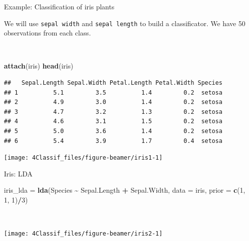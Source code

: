 \documentclass[
  10pt,
  ignorenonframetext,
]{beamer}
\newenvironment{Shaded}{\begin{snugshade}}{\end{snugshade}}
\newcommand{\AttributeTok}[1]{\textcolor[rgb]{0.13,0.29,0.53}{#1}}
\newcommand{\DecValTok}[1]{\textcolor[rgb]{0.00,0.00,0.81}{#1}}
\newcommand{\FunctionTok}[1]{\textcolor[rgb]{0.13,0.29,0.53}{\textbf{#1}}}
\newcommand{\NormalTok}[1]{#1}
\newcommand{\OtherTok}[1]{\textcolor[rgb]{0.56,0.35,0.01}{#1}}
\newcommand{\SpecialCharTok}[1]{\textcolor[rgb]{0.81,0.36,0.00}{\textbf{#1}}}
\begin{document}
\begin{frame}[fragile]
\begin{block}{Example: Classification of iris plants}
\protect\hypertarget{example-classification-of-iris-plants}{}
\vspace{2mm}

We will use \texttt{sepal\ width} and \texttt{sepal\ length} to build a
classificator. We have 50 observations from each class.

\(~\)

\scriptsize

\begin{Shaded}
\begin{Highlighting}[]
\FunctionTok{attach}\NormalTok{(iris)}
\FunctionTok{head}\NormalTok{(iris)}
\end{Highlighting}
\end{Shaded}

\begin{verbatim}
##   Sepal.Length Sepal.Width Petal.Length Petal.Width Species
## 1          5.1         3.5          1.4         0.2  setosa
## 2          4.9         3.0          1.4         0.2  setosa
## 3          4.7         3.2          1.3         0.2  setosa
## 4          4.6         3.1          1.5         0.2  setosa
## 5          5.0         3.6          1.4         0.2  setosa
## 6          5.4         3.9          1.7         0.4  setosa
\end{verbatim}
\end{block}
\end{frame}

\begin{frame}
\begin{center}\texttt{[image: 4Classif\_files/figure-beamer/iris1-1]} \end{center}
\end{frame}

\begin{frame}[fragile]
\begin{block}{Iris: LDA}
\protect\hypertarget{iris-lda}{}
\scriptsize

\begin{Shaded}
\begin{Highlighting}[]
\NormalTok{iris\_lda }\OtherTok{=} \FunctionTok{lda}\NormalTok{(Species }\SpecialCharTok{\textasciitilde{}}\NormalTok{ Sepal.Length }\SpecialCharTok{+}\NormalTok{ Sepal.Width, }\AttributeTok{data =}\NormalTok{ iris, }\AttributeTok{prior =} \FunctionTok{c}\NormalTok{(}\DecValTok{1}\NormalTok{,}
    \DecValTok{1}\NormalTok{, }\DecValTok{1}\NormalTok{)}\SpecialCharTok{/}\DecValTok{3}\NormalTok{)}
\end{Highlighting}
\end{Shaded}

\(~\)

\begin{center}\texttt{[image: 4Classif\_files/figure-beamer/iris2-1]} \end{center}
\end{block}
\end{frame}
\end{document}
